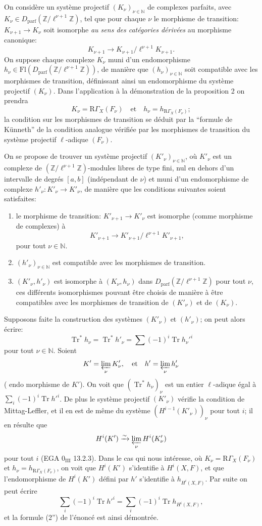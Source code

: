 \documentclass[11pt]{article}
\providecommand{\Tr}{\operatorname{Tr}}
\providecommand{\Tr}{\operatorname{Tr}}
\providecommand{\Tr}{\operatorname{Tr}}
\providecommand{\Tr}{\operatorname{Tr}}
\providecommand{\Tr}{\operatorname{Tr}}
\begin{document}
On considère un système projectif $(K_\nu)_{\nu\in\mathbb N}$ de complexes parfaits, avec $K_\nu\in D_{\mathrm{parf}}(\mathbb Z/\ell^{\nu+1}\mathbb Z)$, tel que pour chaque $\nu$ le
morphisme de transition: $K_{\nu+1}\to K_\nu$ soit isomorphe \emph{au sens des catégories dérivées} au morphisme canonique:
\[
K_{\nu+1}\to K_{\nu+1}/\ell^{\nu+1}K_{\nu+1}.
\]
On suppose chaque complexe $K_\nu$ muni d'un endomorphisme $h_\nu\in\mathrm{Fl}(D_{\mathrm{parf}}(\mathbb Z/\ell^{\nu+1}\mathbb Z))$, de manière que $(h_\nu)_{\nu\in\mathbb N}$ soit compatible avec les morphismes de transition, définissant ainsi un endomorphisme du système projectif $(K_\nu)$. Dans l'application à la démonstration de la proposition 2 on prendra
\[
K_\nu=\mathrm{R}\Gamma_X(F_\nu)\quad\text{et}\quad h_\nu=h_{\mathrm{R}\Gamma_X(F_\nu)};
\]
la condition sur les morphismes de transition se déduit par la ``formule de Künneth'' de la condition analogue vérifiée par les morphismes de transition du système projectif $\ell$-adique $(F_\nu)$.

On se propose de trouver un système projectif $(K'_\nu)_{\nu\in\mathbb N}$, où $K'_\nu$ est un complexe de $(\mathbb Z/\ell^{\nu+1}\mathbb Z)$-modules libres de type fini, nul en dehors d'un intervalle de degrés $[a,b]$ (indépendant de $\nu$) et muni d'un endomorphisme de complexe $h'_\nu:K'_\nu\to K'_\nu$, de manière que les conditions suivantes soient satisfaites:
\begin{enumerate}[label=\arabic*)]
\item le morphisme de transition: $K'_{\nu+1}\to K'_\nu$ est isomorphe (comme morphisme de complexes) à
\[
K'_{\nu+1}\to K'_{\nu+1}/\ell^{\nu+1}K'_{\nu+1},
\]
pour tout $\nu\in\mathbb N$.
\item $(h'_\nu)_{\nu\in\mathbb N}$ est compatible avec les morphismes de transition.
\item $(K'_\nu,h'_\nu)$ est isomorphe à $(K_\nu,h_\nu)$ dans $D_{\mathrm{parf}}(\mathbb Z/\ell^{\nu+1}\mathbb Z)$ pour tout $\nu$, ces différents isomorphismes pouvant être choisis de manière à être compatibles avec les morphismes de transition de $(K'_\nu)$ et de $(K_\nu)$.
\end{enumerate}
Supposons faite la construction des systèmes $(K'_\nu)$ et $(h'_\nu)$; on peut alors écrire:
\[
\Tr^*h_\nu=\Tr^*h'_\nu=\sum(-1)^i\Tr h_\nu'^i
\]
pour tout $\nu\in\mathbb N$. Soient
\[
K'=\varprojlim_\nu K'_\nu,
\quad\text{et}\quad h'=\varprojlim_\nu h'_\nu
\]
(
endo%
morphisme de $K'$). On voit que $(\Tr^*h_\nu)_\nu$ est un entier $\ell$-adique égal à $\sum_i(-1)^i\Tr h'^i$. De plus le système projectif $(K'_\nu)$ vérifie la condition de Mittag-Leffler, et il en est de même du système $(H^{i-1}(K'_\nu))_\nu$ pour tout $i$; il en résulte que
\[
H^i(K')\xrightarrow{\sim}\varprojlim_\nu H^i(K'_\nu)
\]
pour tout $i$ (EGA $0_{\mathrm{III}}$ 13.2.3). Dans le cas qui nous intéresse, où $K_\nu=\mathrm{R}\Gamma_X(F_\nu)$ et $h_\nu=h_{\mathrm{R}\Gamma_X(F_\nu)}$, on voit que $H^i(K')$ s'identifie à $H^i(X,F)$, et que l'endomorphisme de $H^i(K')$ défini par $h'$ s'identifie à $h_{H^i(X,F)}$. Par suite on peut écrire
\[
\sum_i(-1)^i\Tr h'^i=
\sum_i(-1)^i\Tr h_{H^i(X,F)},
\]
et la formule (2'') de l'énoncé est ainsi démontrée.
\end{document}
